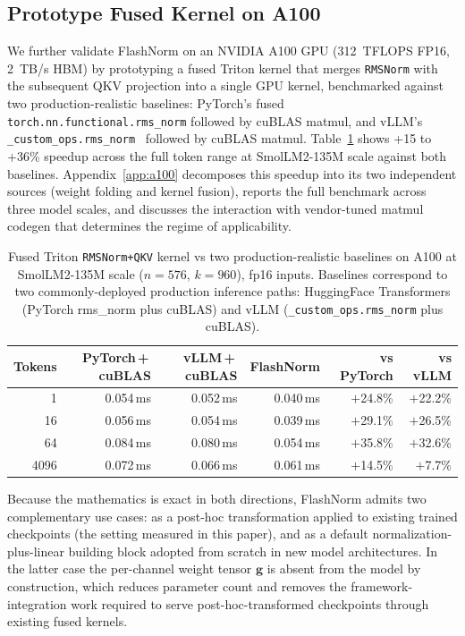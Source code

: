 \documentclass{article}
\begin{document}
\subsection{Prototype Fused Kernel on A100}\label{sec:a100-fused}

We further validate FlashNorm on an NVIDIA A100 GPU (312~TFLOPS FP16, 2~TB/s HBM) by prototyping a fused Triton kernel that merges \texttt{RMSNorm} with the subsequent QKV projection into a single GPU kernel, benchmarked against two production-realistic baselines: PyTorch's fused \texttt{torch.nn.functional.rms\_norm} followed by cuBLAS matmul, and vLLM's \texttt{\_custom\_ops.rms\_norm}~\citep{vLLM} followed by cuBLAS matmul. Table~\ref{tab:a100-fused} shows +15 to +36\% speedup across the full token range at SmolLM2-135M scale against both baselines. Appendix~\ref{app:a100} decomposes this speedup into its two independent sources (weight folding and kernel fusion), reports the full benchmark across three model scales, and discusses the interaction with vendor-tuned matmul codegen that determines the regime of applicability.

\begin{table}[h!] \centering
\caption{Fused Triton \texttt{RMSNorm+QKV} kernel vs two production-realistic baselines on A100 at SmolLM2-135M scale ($n{=}576$, $k{=}960$), fp16 inputs. Baselines correspond to two commonly-deployed production inference paths: HuggingFace Transformers (PyTorch rms\_norm plus cuBLAS) and vLLM (\texttt{\_custom\_ops.rms\_norm} plus cuBLAS).}
\label{tab:a100-fused}
\begin{tabular}{r r r r r r}
\hline
Tokens & PyTorch\,+\,cuBLAS & vLLM\,+\,cuBLAS & FlashNorm & vs PyTorch & vs vLLM \\
\hline
1     & 0.054\,ms & 0.052\,ms & 0.040\,ms & $+$24.8\% & $+$22.2\% \\
16    & 0.056\,ms & 0.054\,ms & 0.039\,ms & $+$29.1\% & $+$26.5\% \\
64    & 0.084\,ms & 0.080\,ms & 0.054\,ms & $+$35.8\% & $+$32.6\% \\
4096  & 0.072\,ms & 0.066\,ms & 0.061\,ms & $+$14.5\% & $+$7.7\%  \\
\hline
\end{tabular}
\end{table}

Because the mathematics is exact in both directions, FlashNorm admits two complementary use cases: as a post-hoc transformation applied to existing trained checkpoints (the setting measured in this paper), and as a default normalization-plus-linear building block adopted from scratch in new model architectures. In the latter case the per-channel weight tensor $\mathbf{g}$ is absent from the model by construction, which reduces parameter count and removes the framework-integration work required to serve post-hoc-transformed checkpoints through existing fused kernels.
\end{document}
